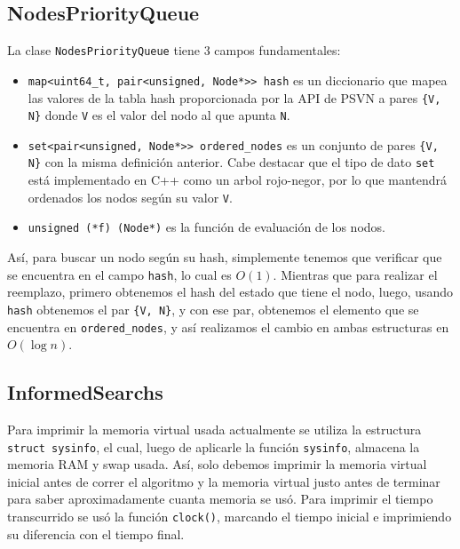 \documentclass[a4paper,10pt]{article}
\begin{document}
  \subsection{NodesPriorityQueue}
    La clase \verb|NodesPriorityQueue| tiene 3 campos fundamentales:
    \begin{itemize}
      \item \verb|map<uint64_t, pair<unsigned, Node*>> hash| es un diccionario
      que mapea las valores de la tabla hash proporcionada por la API de PSVN
      a pares \verb|{V, N}| donde \verb|V| es el valor del nodo al que apunta
      \verb|N|.

      \item \verb|set<pair<unsigned, Node*>> ordered_nodes| es un conjunto de 
      pares \verb|{V, N}| con la misma definici\'on anterior. Cabe destacar 
      que el tipo de dato \verb|set| est\'a implementado en C++ como un arbol 
      rojo-negor, por lo que mantendr\'a ordenados los nodos seg\'un su valor 
      \verb|V|.

      \item \verb|unsigned (*f) (Node*)| es la funci\'on de evaluaci\'on de 
      los nodos.
    \end{itemize}

    As\'i, para buscar un nodo seg\'un su hash, simplemente tenemos que verificar
    que se encuentra en el campo \verb|hash|, lo cual es $O(1)$. Mientras que 
    para realizar el reemplazo, primero obtenemos el hash del estado que tiene 
    el nodo, luego, usando \verb|hash| obtenemos el par \verb|{V, N}|, y con ese 
    par, obtenemos el elemento que se encuentra en \verb|ordered_nodes|, y as\'i 
    realizamos el cambio en ambas estructuras en $O(\log n)$.

  
  \subsection{InformedSearchs}
    Para imprimir la memoria virtual usada actualmente se utiliza la estructura 
    \verb|struct sysinfo|, el cual, luego de aplicarle la funci\'on \verb|sysinfo|,
    almacena la memoria RAM y swap usada. As\'i, solo debemos imprimir la memoria 
    virtual inicial antes de correr el algoritmo y la memoria virtual justo antes 
    de terminar para saber aproximadamente cuanta memoria se us\'o. Para imprimir 
    el tiempo transcurrido se us\'o la funci\'on \verb|clock()|, marcando el tiempo 
    inicial e imprimiendo su diferencia con el tiempo final. \\
\end{document}
